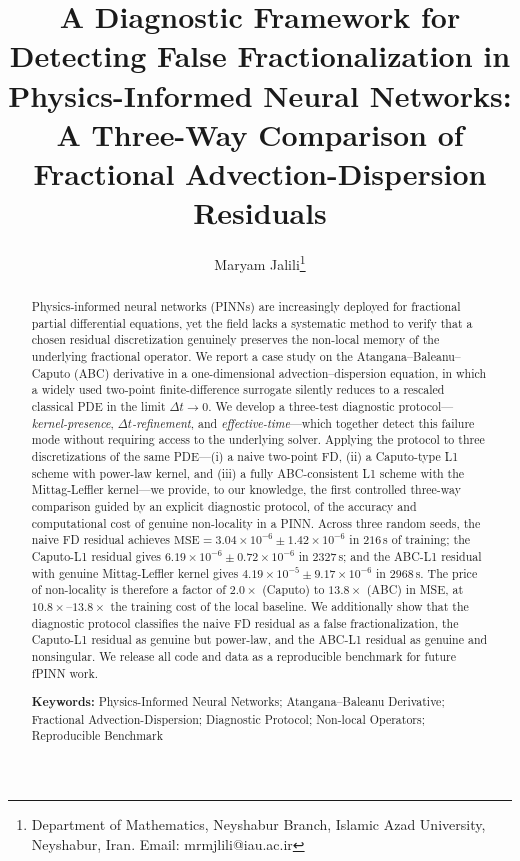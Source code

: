 \documentclass[11pt]{article}
\title{\textbf{A Diagnostic Framework for Detecting False Fractionalization in Physics-Informed Neural Networks: \\ A Three-Way Comparison of Fractional Advection-Dispersion Residuals}}
\author{Maryam Jalili\thanks{Department of Mathematics, Neyshabur Branch, Islamic Azad University, Neyshabur, Iran. Email: mrmjlili@iau.ac.ir}}
\date{}
\begin{document}
\maketitle

\begin{abstract}
\noindent
Physics-informed neural networks (PINNs) are increasingly deployed for fractional partial differential equations, yet the field lacks a systematic method to verify that a chosen residual discretization genuinely preserves the non-local memory of the underlying fractional operator. We report a case study on the Atangana--Baleanu--Caputo (ABC) derivative in a one-dimensional advection--dispersion equation, in which a widely used two-point finite-difference surrogate silently reduces to a rescaled classical PDE in the limit \(\Delta t \to 0\). We develop a three-test diagnostic protocol---\emph{kernel-presence}, \emph{\(\Delta t\)-refinement}, and \emph{effective-time}---which together detect this failure mode without requiring access to the underlying solver. Applying the protocol to three discretizations of the same PDE---(i) a naive two-point FD, (ii) a Caputo-type L1 scheme with power-law kernel, and (iii) a fully ABC-consistent L1 scheme with the Mittag-Leffler kernel---we provide, to our knowledge, the first controlled three-way comparison guided by an explicit diagnostic protocol, of the accuracy and computational cost of genuine non-locality in a PINN. Across three random seeds, the naive FD residual achieves \(\mathrm{MSE} = 3.04 \times 10^{-6} \pm 1.42 \times 10^{-6}\) in \(216\)\,s of training; the Caputo-L1 residual gives \(6.19 \times 10^{-6} \pm 0.72 \times 10^{-6}\) in \(2327\)\,s; and the ABC-L1 residual with genuine Mittag-Leffler kernel gives \(4.19 \times 10^{-5} \pm 9.17 \times 10^{-6}\) in \(2968\)\,s. The price of non-locality is therefore a factor of \(2.0\times\) (Caputo) to \(13.8\times\) (ABC) in MSE, at \(10.8\times\)--\(13.8\times\) the training cost of the local baseline. We additionally show that the diagnostic protocol classifies the naive FD residual as a false fractionalization, the Caputo-L1 residual as genuine but power-law, and the ABC-L1 residual as genuine and nonsingular. We release all code and data as a reproducible benchmark for future fPINN work.

\vspace{0.5cm}
\noindent\textbf{Keywords:} Physics-Informed Neural Networks; Atangana--Baleanu Derivative; Fractional Advection-Dispersion; Diagnostic Protocol; Non-local Operators; Reproducible Benchmark
\end{abstract}
\end{document}

